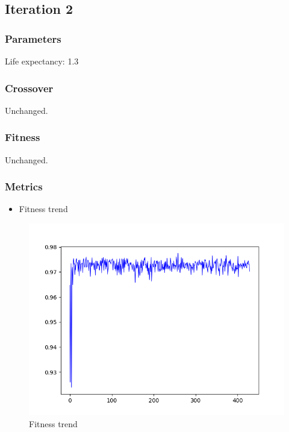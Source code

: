 \documentclass[11pt]{article}
\makeatletter
\def\maxwidth{\ifdim\Gin@nat@width>\linewidth\linewidth
    \else\Gin@nat@width\fi}
\let\Oldincludegraphics\includegraphics
\renewcommand{\includegraphics}[1]{\Oldincludegraphics[width=.8\maxwidth]{#1}}
\providecommand{\tightlist}{%
      \setlength{\itemsep}{0pt}\setlength{\parskip}{0pt}}
\makeatother
\begin{document}
    \hypertarget{iteration-2}{%
\subsection*{Iteration 2}\label{iteration-2}}

\hypertarget{parameters}{%
\subsubsection*{Parameters}\label{parameters}}

Life expectancy: 1.3

\hypertarget{crossover}{%
\subsubsection*{Crossover}\label{crossover}}

Unchanged.

\hypertarget{fitness}{%
\subsubsection*{Fitness}\label{fitness}}

Unchanged.

\hypertarget{metrics}{%
\subsubsection*{Metrics}\label{metrics}}

\begin{itemize}
\tightlist
\item
  Fitness trend
\end{itemize}

\begin{figure}
\centering
\includegraphics{gfx/fitness-trend-tne-2.png}
\caption{Fitness trend}
\end{figure}
\end{document}
